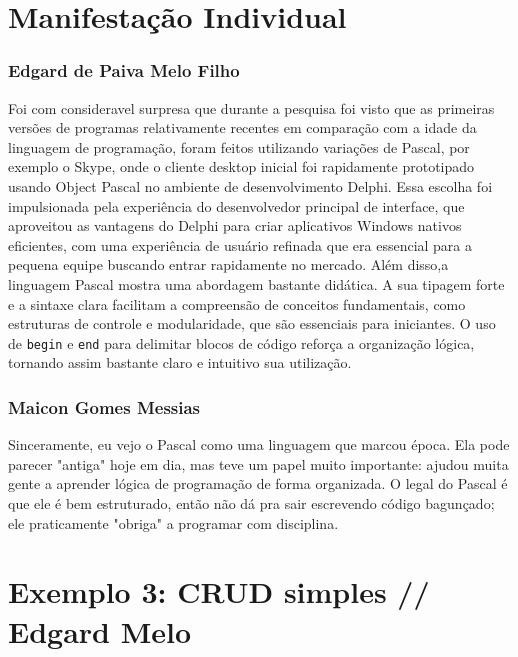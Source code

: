 \documentclass[12pt,a4paper,oneside]{abntex2}
\begin{document}
\appendix
\chapter{Manifestação Individual}
\subsection{Edgard de Paiva Melo Filho}
Foi com consideravel surpresa que durante a pesquisa foi visto que as primeiras versões de programas relativamente recentes em comparação com a idade da linguagem de programação, foram feitos utilizando variações de Pascal, por exemplo o Skype, onde o cliente desktop inicial foi rapidamente prototipado usando Object Pascal no ambiente de desenvolvimento Delphi. Essa escolha foi impulsionada pela experiência do desenvolvedor principal de interface, que aproveitou as vantagens do Delphi para criar aplicativos Windows nativos eficientes, com uma experiência de usuário refinada que era essencial para a pequena equipe buscando entrar rapidamente no mercado.
Além disso,a linguagem Pascal mostra uma abordagem bastante didática. A sua tipagem forte e a sintaxe clara facilitam a compreensão de conceitos fundamentais, como estruturas de controle e modularidade, que são essenciais para iniciantes. O uso de \texttt{begin} e \texttt{end} para delimitar blocos de código reforça a organização lógica, tornando assim bastante claro e intuitivo sua utilização.

\subsection{Maicon Gomes Messias}
Sinceramente, eu vejo o Pascal como uma linguagem que marcou época. Ela pode parecer "antiga" hoje em dia, mas teve um papel muito importante: ajudou muita gente a aprender lógica de programação de forma organizada. O legal do Pascal é que ele é bem estruturado, então não dá pra sair escrevendo código bagunçado; ele praticamente "obriga" a programar com disciplina.

\anexo
\chapter{Exemplo 3: CRUD simples // Edgard Melo}
\end{document}
